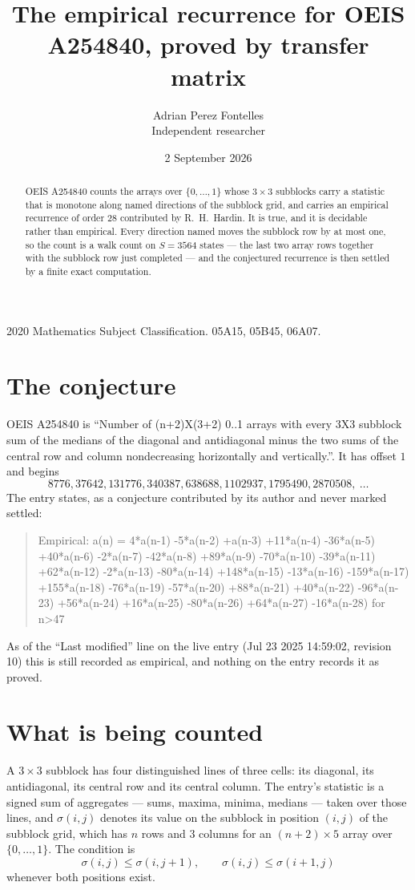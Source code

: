 \documentclass[11pt,a4paper]{article}
\title{The empirical recurrence for OEIS A254840, proved by transfer matrix}
\author{Adrian Perez Fontelles\\ \small Independent researcher}
\date{2 September 2026}
\theoremstyle{plain}
\theoremstyle{definition}
\begin{document}
\maketitle

\begin{abstract}
OEIS A254840 counts the arrays over $\{0,\dots,1\}$ whose $3\times3$ subblocks carry a
statistic that is monotone along named directions of the subblock grid, and carries an
empirical recurrence of order $28$ contributed by R.~H.~Hardin. It is true, and it is
decidable rather than empirical. Every direction named moves the subblock row by at most one,
so the count is a walk count on $S=3564$ states --- the last two array rows together with the
subblock row just completed --- and the conjectured recurrence is then settled by a finite
exact computation.
\end{abstract}

\noindent\small 2020 Mathematics Subject Classification. 05A15, 05B45, 06A07.\normalsize

\section{The conjecture}

OEIS A254840 is ``Number of (n+2)X(3+2) 0..1 arrays with every 3X3 subblock sum of the medians of the diagonal and antidiagonal minus the two sums of the central row and column nondecreasing horizontally and vertically.''. It has offset $1$ and begins
\[
8776, 37642, 131776, 340387, 638688, 1102937, 1795490, 2870508,\ \dots
\]
The entry states, as a conjecture contributed by its author and never marked settled:
\begin{quote}
Empirical: a(n) = 4*a(n-1) -5*a(n-2) +a(n-3) +11*a(n-4) -36*a(n-5) +40*a(n-6) -2*a(n-7) -42*a(n-8) +89*a(n-9) -70*a(n-10) -39*a(n-11) +62*a(n-12) -2*a(n-13) -80*a(n-14) +148*a(n-15) -13*a(n-16) -159*a(n-17) +155*a(n-18) -76*a(n-19) -57*a(n-20) +88*a(n-21) +40*a(n-22) -96*a(n-23) +56*a(n-24) +16*a(n-25) -80*a(n-26) +64*a(n-27) -16*a(n-28) for n>47
\end{quote}
As of the ``Last modified'' line on the live entry (Jul 23 2025 14:59:02, revision 10) this is still
recorded as empirical, and nothing on the entry records it as proved.

\section{What is being counted}

A $3\times3$ subblock has four distinguished lines of three cells: its diagonal, its
antidiagonal, its central row and its central column. The entry's statistic is a signed sum of
aggregates --- sums, maxima, minima, medians --- taken over those lines, and $\sigma(i,j)$
denotes its value on the subblock in position $(i,j)$ of the subblock grid, which has $n$ rows
and $3$ columns for an $(n+2)\times5$ array over $\{0,\dots,1\}$. The condition is
\[
\sigma(i,j)\le\sigma(i,j+1),\qquad \sigma(i,j)\le\sigma(i+1,j)
\]
whenever both positions exist.
\end{document}
